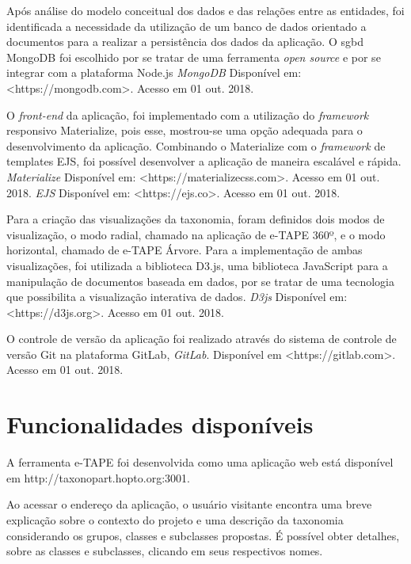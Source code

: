 \par
Após análise do modelo conceitual dos dados e das relações entre as entidades, foi identificada a necessidade da utilização de um banco de dados orientado a documentos para a 
realizar a persistência dos dados da aplicação. 
O \acrfull{sgbd} MongoDB foi escolhido por se tratar de uma ferramenta \textit{open source} e por se integrar com a plataforma Node.js 
\textit{MongoDB} Disponível em: <https://mongodb.com>. Acesso em 01 out. 2018.

\par
O \textit{front-end} da aplicação, foi implementado com a utilização do \textit{framework} responsivo Materialize, pois esse, 
mostrou-se uma opção adequada para o desenvolvimento da aplicação. Combinando o Materialize com o \textit{framework} de templates EJS, 
foi possível desenvolver a aplicação de maneira escalável e rápida. \textit{Materialize} Disponível em: <https://materializecss.com>. Acesso em 01 out. 2018.
\textit{EJS} Disponível em: <https://ejs.co>. Acesso em 01 out. 2018.

\par
Para a criação das visualizações da taxonomia, foram definidos dois modos de visualização, o modo radial, chamado na aplicação de e-TAPE 360º, e o modo horizontal, 
chamado de e-TAPE Árvore. Para a implementação de ambas visualizações, foi utilizada a biblioteca D3.js, uma biblioteca JavaScript para a manipulação de documentos 
baseada em dados, por se tratar de uma tecnologia que possibilita a visualização interativa de dados.
\textit{D3js} Disponível em: <https://d3js.org>. Acesso em 01 out. 2018.

\par
O controle de versão da aplicação foi realizado através do sistema de controle de versão Git na plataforma GitLab, \textit{GitLab}. 
Disponível em <https://gitlab.com>. Acesso em 01 out. 2018.

\section{Funcionalidades disponíveis}
\label{sec:funcionamento}
A ferramenta e-TAPE foi desenvolvida como uma aplicação web está disponível em http://taxonopart.hopto.org:3001.

\par
Ao acessar o endereço da aplicação, o usuário visitante encontra uma breve explicação sobre o contexto do projeto e uma descrição da taxonomia considerando os grupos,
classes e subclasses propostas. É possível obter detalhes, sobre as classes e subclasses, clicando em seus respectivos nomes. 

